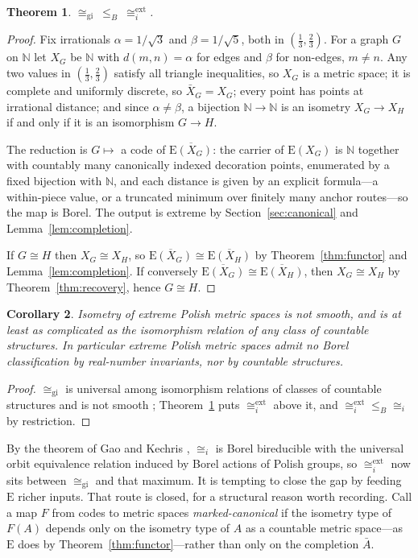 \documentclass[11pt]{article}
\newtheorem{theorem}{Theorem}[section]
\newtheorem{corollary}[theorem]{Corollary}
\theoremstyle{definition}
\theoremstyle{remark}
\newcommand{\N}{\mathbb{N}}
\newcommand{\E}{\mathrm{E}}
\newcommand{\GI}{\cong_{\mathrm{gi}}}
\newcommand{\isoi}{\cong_i}
\newcommand{\isox}{\cong_i^{\mathrm{ext}}}
\newcommand{\leB}{\leq_B}
\begin{document}
\begin{theorem}\label{thm:gi}
$\GI\ \leB\ \isox$.
\end{theorem}

\begin{proof}
Fix irrationals $\alpha=1/\sqrt3$ and $\beta=1/\sqrt5$, both in $(\tfrac13,\tfrac23)$. For
a graph $G$ on $\N$ let $X_G$ be $\N$ with $d(m,n)=\alpha$ for edges and $\beta$ for
non-edges, $m\neq n$. Any two values in $(\tfrac13,\tfrac23)$ satisfy all triangle
inequalities, so $X_G$ is a metric space; it is complete and uniformly discrete, so
$\bar X_G=X_G$; every point has points at irrational distance; and since
$\alpha\neq\beta$, a bijection $\N\to\N$ is an isometry $X_G\to X_H$ if and only if it is
an isomorphism $G\to H$.

The reduction is $G\mapsto$ a code of $\overline{\E(X_G)}$: the carrier of $\E(X_G)$ is
$\N$ together with countably many canonically indexed decoration points, enumerated by a
fixed bijection with $\N$, and each distance is given by an explicit formula---a
within-piece value, or a truncated minimum over finitely many anchor routes---so the map is
Borel. The output is extreme by Section~\ref{sec:canonical} and
Lemma~\ref{lem:completion}.

If $G\cong H$ then $X_G\cong X_H$, so $\overline{\E(X_G)}\cong\overline{\E(X_H)}$ by
Theorem~\ref{thm:functor} and Lemma~\ref{lem:completion}. If conversely
$\overline{\E(X_G)}\cong\overline{\E(X_H)}$, then $X_G\cong X_H$ by
Theorem~\ref{thm:recovery}, hence $G\cong H$.
\end{proof}

\begin{corollary}\label{cor:nonclass}
Isometry of extreme Polish metric spaces is not smooth, and is at least as complicated as
the isomorphism relation of any class of countable structures. In particular extreme Polish
metric spaces admit no Borel classification by real-number invariants, nor by countable
structures.
\end{corollary}

\begin{proof}
$\GI$ is universal among isomorphism relations of classes of countable structures and is
not smooth \cite{Hjorth00}; Theorem~\ref{thm:gi} puts $\isox$ above it, and
$\isox\leB\isoi$ by restriction.
\end{proof}

By the theorem of Gao and Kechris \cite{GaoKechris03}, $\isoi$ is Borel bireducible with
the universal orbit equivalence relation induced by Borel actions of Polish groups, so
$\isox$ now sits between $\GI$ and that maximum. It is tempting to close the gap by
feeding $\E$ richer inputs. That route is closed, for a structural reason worth recording.
Call a map $F$ from codes to metric spaces \emph{marked-canonical} if the isometry type of
$F(A)$ depends only on the isometry type of $A$ as a countable metric space---as $\E$ does
by Theorem~\ref{thm:functor}---rather than only on the completion $\bar A$.
\end{document}
